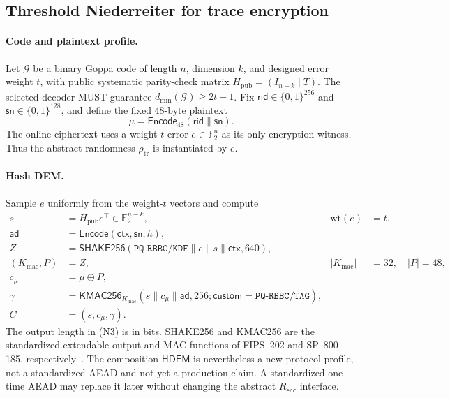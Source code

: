 \documentclass[11pt]{article}
\newcommand{\HDEM}{\mathsf{HDEM}}
\newcommand{\rid}{\mathsf{rid}}
\newcommand{\sn}{\mathsf{sn}}
\newcommand{\ctx}{\mathsf{ctx}}
\begin{document}
\subsection{Threshold Niederreiter for trace encryption}

\paragraph{Code and plaintext profile.}
Let $\mathcal G$ be a binary Goppa code of length $n$, dimension $k$, and
designed error weight $t$, with public systematic parity-check matrix
$H_{\mathrm{pub}}=(I_{n-k}\mid T)$.  The selected decoder MUST guarantee
$d_{\min}(\mathcal G)\geq 2t+1$.  Fix
$\rid\in\{0,1\}^{256}$ and $\sn\in\{0,1\}^{128}$, and define the fixed
48-byte plaintext
\[
  \mu=\mathsf{Encode}_{48}(\rid\|\sn).
\]
The online ciphertext uses a weight-$t$ error $e\in\mathbb F_2^n$ as its only
encryption witness.  Thus the abstract randomness $\rho_{\mathrm{tr}}$ is
instantiated by $e$.

\paragraph{Hash DEM.}
Sample $e$ uniformly from the weight-$t$ vectors and compute
\begin{align}
 s&=H_{\mathrm{pub}}e^\top\in\mathbb F_2^{n-k},
   &\mathrm{wt}(e)&=t, \tag{N1}\label{eq:n1}\\
 \mathsf{ad}&=\mathsf{Encode}(\ctx,\sn,h), &&\tag{N2}\label{eq:n2}\\
 Z&=\mathsf{SHAKE256}(
   \mathtt{PQ\mbox{-}RBBC/KDF}\|e\|s\|\ctx,640),
   &&\tag{N3}\label{eq:n3}\\
 (K_{\mathrm{mac}},P)&=Z,
   &|K_{\mathrm{mac}}|&=32,\quad |P|=48, \tag{N4}\label{eq:n4}\\
 c_\mu&=\mu\oplus P, &&\tag{N5}\label{eq:n5}\\
 \gamma&=\mathsf{KMAC256}_{K_{\mathrm{mac}}}
 (s\|c_\mu\|\mathsf{ad},256;
   \mathsf{custom}=\mathtt{PQ\mbox{-}RBBC/TAG}),
 &&\tag{N6}\label{eq:n6}\\
 C&=(s,c_\mu,\gamma). &&\tag{N7}\label{eq:n7}
\end{align}
The output length in (N3) is in bits.  SHAKE256 and KMAC256 are the standardized
extendable-output and MAC functions of FIPS~202 and SP~800-185,
respectively~\cite{fips202,sp800185}.  The composition $\HDEM$ is nevertheless a
new protocol profile, not a standardized AEAD and not yet a production claim.
A standardized one-time AEAD may replace it later without changing the abstract
$R_{\mathsf{enc}}$ interface.
\end{document}
